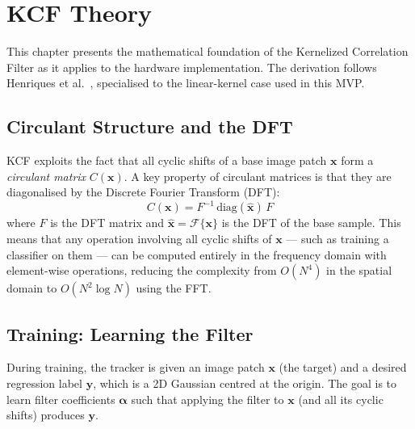 \documentclass[a4paper,12pt]{report}
\begin{document}
\chapter{KCF Theory}

This chapter presents the mathematical foundation of the Kernelized Correlation Filter as it applies to the hardware implementation. The derivation follows Henriques et al.\ \cite{henriques2015}, specialised to the linear-kernel case used in this MVP.

\section{Circulant Structure and the DFT}

KCF exploits the fact that all cyclic shifts of a base image patch $\mathbf{x}$ form a \textit{circulant matrix} $C(\mathbf{x})$. A key property of circulant matrices is that they are diagonalised by the Discrete Fourier Transform (DFT):
\begin{equation}
    C(\mathbf{x}) = F^{-1} \, \text{diag}(\hat{\mathbf{x}}) \, F
    \label{eq_circulant}
\end{equation}
where $F$ is the DFT matrix and $\hat{\mathbf{x}} = \mathcal{F}\{\mathbf{x}\}$ is the DFT of the base sample. This means that any operation involving all cyclic shifts of $\mathbf{x}$ --- such as training a classifier on them --- can be computed entirely in the frequency domain with element-wise operations, reducing the complexity from $O(N^4)$ in the spatial domain to $O(N^2 \log N)$ using the FFT.

\section{Training: Learning the Filter}

During training, the tracker is given an image patch $\mathbf{x}$ (the target) and a desired regression label $\mathbf{y}$, which is a 2D Gaussian centred at the origin. The goal is to learn filter coefficients $\boldsymbol{\alpha}$ such that applying the filter to $\mathbf{x}$ (and all its cyclic shifts) produces $\mathbf{y}$.
\end{document}

